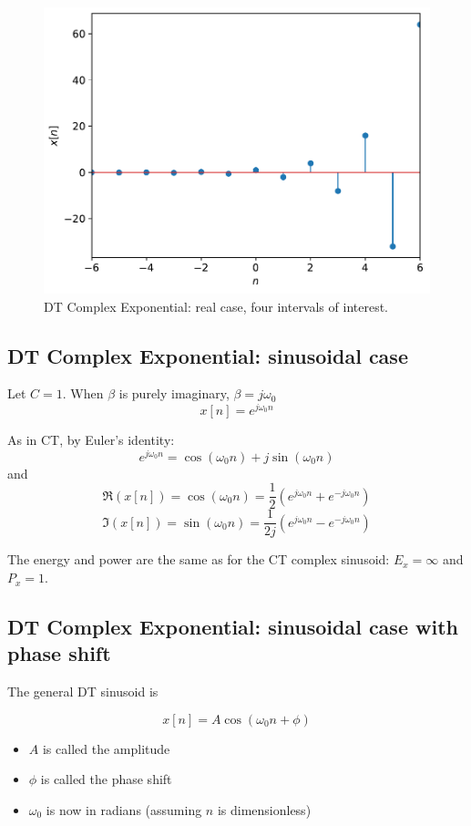 \begin{figure}[ht]
\includegraphics[scale=0.5]{graphics/dtexpcase4.pdf}
\caption{ DT Complex Exponential: real case, four intervals of interest.}
\label{fig:dtexpreal}
\end{figure}

\subsection{DT Complex Exponential: sinusoidal case}

Let $C = 1$. When $\beta$ is purely imaginary, $\beta = j\omega_0$
\[
x[n] = e^{j\omega_0 n}
\]

As in CT, by Euler's identity:
\[
e^{j\omega_0 n} = \cos(\omega_0 n) + j\sin(\omega_0 n)
\]
and
\[
\Re(x[n]) = \cos(\omega_0 n) = \frac{1}{2}\left( e^{j\omega_0 n} + e^{-j\omega_0 n} \right)
\]
\[
\Im(x[n]) = \sin(\omega_0 n) = \frac{1}{2j}\left( e^{j\omega_0 n} - e^{-j\omega_0 n} \right)
\]

The energy and power are the same as for the CT complex sinusoid: $E_x = \infty$ and $P_x = 1$.


\subsection{DT Complex Exponential: sinusoidal case with phase shift}

The general DT sinusoid is

\[
x[n] = A\cos(\omega_0 n + \phi)
\]

\begin{itemize}
\item $A$ is called the amplitude
\item $\phi$ is called the phase shift
\item $\omega_0$ is now in radians (assuming $n$ is dimensionless)
\end{itemize}


